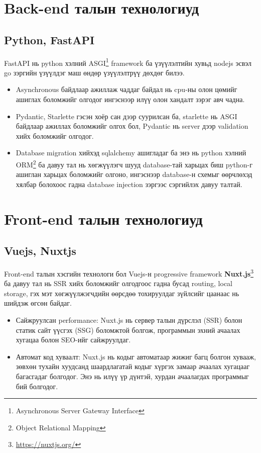 \section{Back-end талын технологиуд}
\subsection{Python, FastAPI}
FastAPI нь python хэлний ASGI\footnote{Asynchronous Server Gateway Interface}
framework ба үзүүлэлтийн хувьд nodejs эсвэл go зэргийн үзүүлдэг маш өндөр үзүүлэлтрүү дөхдөг билээ.

\begin{itemize}
	\item Asynchronous байдлаар ажиллаж чаддаг байдал нь cpu-ны олон цөмийг ашиглах боломжийг олгодог ингэснээр илүү олон хандалт зэрэг авч чадна.
	\item Pydantic, Starlette гэсэн хоёр сан дээр суурилсан ба, starlette нь ASGI байдлаар ажиллах боломжийг олгох бол, Pydantic нь server дээр validation хийх боломжийг олгодог.
	\item Database migration хийхэд sqlalchemy ашигладаг ба энэ нь python хэлний ORM\footnote{Object Relational Mapping} ба давуу тал нь хөгжүүлэгч шууд database-тай харьцах биш python-г ашиглан харьцах боломжийг олгоно,    ингэснээр database-н схемыг өөрчлөхэд хялбар болохоос гадна database injection зэргээс сэргийлэх давуу талтай.
\end{itemize}


\section{Front-end талын технологиуд}
\subsection{Vuejs, Nuxtjs}
Front-end талын хэсгийн технологи бол Vuejs-н progressive framework \textbf{Nuxt.js}\footnote{\url{https://nuxtjs.org/}} ба давуу тал нь SSR хийх боломжийг олгодгоос гадна бусад routing, local storage, гэх мэт хөгжүүлжэгчдийн өөрсдөө тохируулдаг зүйлсийг цаанаас нь шийдэж өгсөн байдаг.

\begin{itemize}
	\item Сайжруулсан performance: Nuxt.js нь сервер талын дүрслэл (SSR) болон статик сайт үүсгэх (SSG) боломжтой болгож, программын эхний ачаалах хугацаа болон SEO-ийг
	сайжруулдаг.
	\item Автомат код хуваалт: Nuxt.js нь кодыг автоматаар жижиг багц болгон хувааж, зөвхөн тухайн хуудсанд шаардлагатай кодыг хүргэх замаар ачаалах хугацааг багасгадаг болгодог. Энэ нь илүү үр дүнтэй, хурдан ачаалагдах программыг бий болгодог.
\end{itemize}

